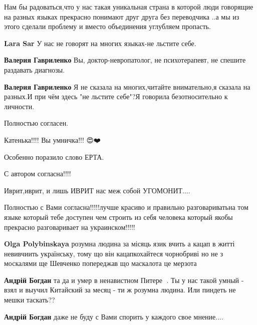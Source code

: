 \begin{itemize}
\begin{itemize}
\end{itemize}

Нам бы радоваться,что у нас такая уникальная страна в которой люди говорящие на разных языках прекрасно понимают друг друга без переводчика ..а мы из этого сделали проблему и вместо объединения углубляем пропасть.

\begin{itemize}
\textbf{Lara Sar} У нас не говорят на многих языках-не льстите себе.

\textbf{Валерия Гавриленко} Вы, доктор-невропатолог, не психотерапевт, не спешите раздавать диагнозы.

\textbf{Валерия Гавриленко} Я не сказала на многих,читайте внимательно,я сказала на разных.И при чём здесь "не льстите себе"?Я говорила безотносительно к личности.
\end{itemize}

Полностью согласен.

Катенька!!!! Вы умничка!!! 😍❤️🌹😘😘😘

Особенно поразило слово ЕРТА.

С автором согласна!!!!

Иврит,иврит, и лишь ИВРИТ нас меж собой УГОМОНИТ....


Полностью с Вами согласна!!!!!лучше красиво и правильно разговариватьна том
языке который тебе доступен чем строить из себя человека который якобы
прекрасно разговаривает на украинском!!!!!

\begin{itemize}


\textbf{Olga Polybinskaya} розумна людина за місяць язик вчить а кацап в житті
невивчиить українську, тому що він кацап\Laughey[1.0] кохайтеся чорнобриві но не з
москалями \Laughey[1.0] ще Шевченко попереджав що маскалота це мерзота \Laughey[1.0]\Laughey[1.0]\Laughey[1.0]

\textbf{Андрій Богдан} та да и умер в ненавистном Питере 🙂. Ты у нас такой умный - взял и выучил Китайский за месяц - ти ж розумна людина. Или пиндеть не мешки таскать?? \Laughey[1.0]

\textbf{Андрій Богдан} даже не буду с Вами спорить у каждого свое мнение....


\end{itemize}
\end{itemize}
